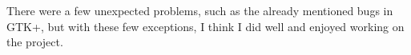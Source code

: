 \documentclass[11pt,a4paper,twoside,openright]{report}
\let\openright=\cleardoublepage
\begin{document}
There were a few unexpected problems, such as the already mentioned bugs in GTK+, but with these few exceptions, I think I did well and enjoyed working on the project.

\printbibliography[title={Seznam použité literatury},heading={bibintoc}]

\openright
\listoffigures
{}

\clearpage
\listoftables
{}


\end{document}
